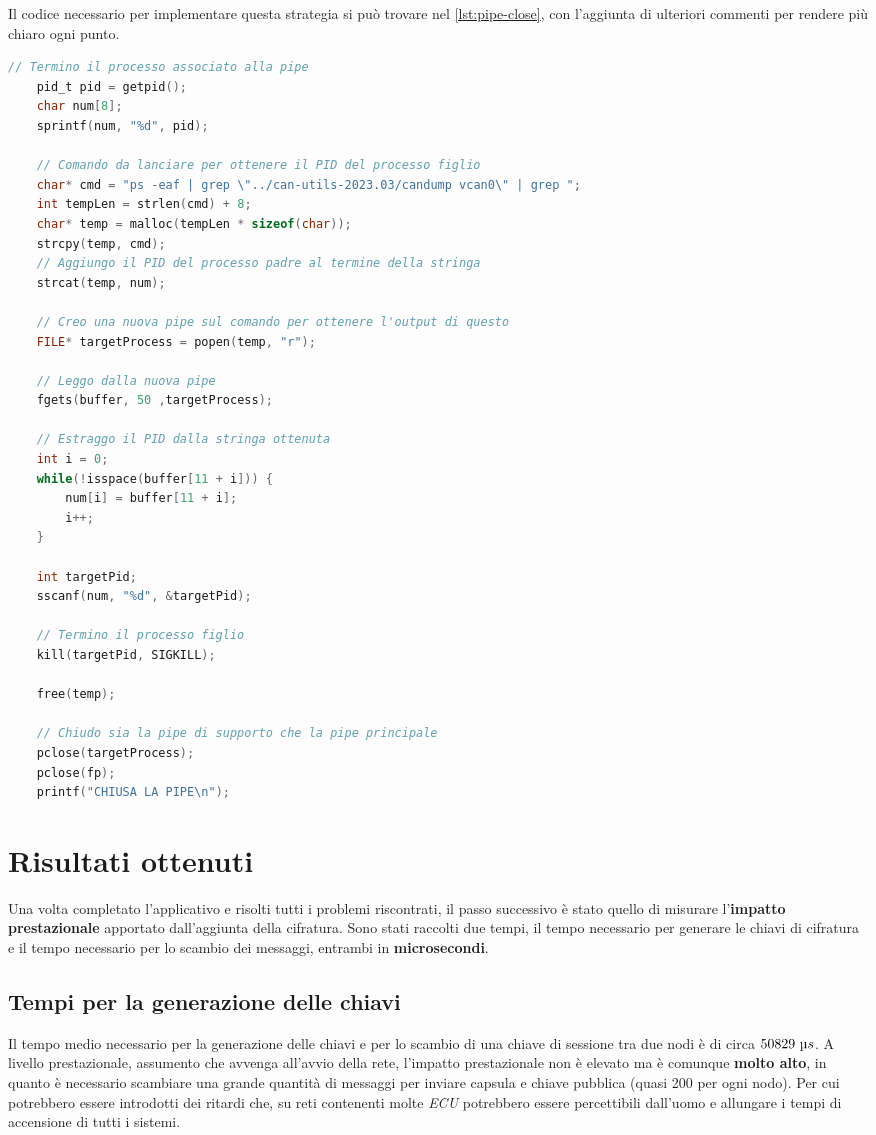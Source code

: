 Il codice necessario per implementare questa strategia si può trovare nel \autoref{lst:pipe-close}, con l'aggiunta di ulteriori commenti per rendere più chiaro ogni punto.

\begin{lstlisting}[language=c, caption=Operazioni necessarie per chiudere la \emph{pipe}, label=lst:pipe-close]
    // Termino il processo associato alla pipe
    pid_t pid = getpid();
    char num[8];
    sprintf(num, "%d", pid);

    // Comando da lanciare per ottenere il PID del processo figlio
    char* cmd = "ps -eaf | grep \"../can-utils-2023.03/candump vcan0\" | grep ";
    int tempLen = strlen(cmd) + 8;
    char* temp = malloc(tempLen * sizeof(char));
    strcpy(temp, cmd);
    // Aggiungo il PID del processo padre al termine della stringa
    strcat(temp, num);
    
    // Creo una nuova pipe sul comando per ottenere l'output di questo
    FILE* targetProcess = popen(temp, "r");

    // Leggo dalla nuova pipe
    fgets(buffer, 50 ,targetProcess);

    // Estraggo il PID dalla stringa ottenuta
    int i = 0;
    while(!isspace(buffer[11 + i])) {
        num[i] = buffer[11 + i];
        i++;
    }

    int targetPid;
    sscanf(num, "%d", &targetPid);

    // Termino il processo figlio
    kill(targetPid, SIGKILL);

    free(temp);

    // Chiudo sia la pipe di supporto che la pipe principale
    pclose(targetProcess);
    pclose(fp);
    printf("CHIUSA LA PIPE\n");
\end{lstlisting}

\section{Risultati ottenuti}
Una volta completato l'applicativo e risolti tutti i problemi riscontrati, il passo successivo è stato quello di misurare l'\textbf{impatto prestazionale} apportato dall'aggiunta della cifratura. Sono stati raccolti due tempi, il tempo necessario per generare le chiavi di cifratura e il tempo necessario per lo scambio dei messaggi, entrambi in \textbf{microsecondi}.

\subsection{Tempi per la generazione delle chiavi}
Il tempo medio necessario per la generazione delle chiavi e per lo scambio di una chiave di sessione tra due nodi è di circa $50829\ \micro s$. A livello prestazionale, assumento che avvenga all'avvio della rete, l'impatto prestazionale non è elevato ma è comunque \textbf{molto alto}, in quanto è necessario scambiare una grande quantità di messaggi per inviare capsula e chiave pubblica (quasi 200 per ogni nodo). Per cui potrebbero essere introdotti dei ritardi che, su reti contenenti molte \emph{ECU} potrebbero essere percettibili dall'uomo e allungare i tempi di accensione di tutti i sistemi.

